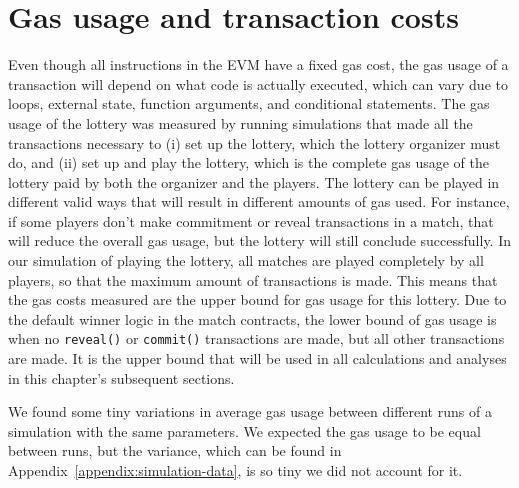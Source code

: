 \section{Gas usage and transaction costs}
\label{sec:gas}

Even though all instructions in the EVM have a fixed gas cost, the gas usage of a transaction will depend on what code is actually executed, which can vary due to loops, external state, function arguments, and conditional statements. The gas usage of the lottery was measured by running simulations that made all the transactions necessary to (i) set up the lottery, which the lottery organizer must do, and (ii) set up and play the lottery, which is the complete gas usage of the lottery paid by both the organizer and the players. The lottery can be played in different valid ways that will result in different amounts of gas used. For instance, if some players don't make commitment or reveal transactions in a match, that will reduce the overall gas usage, but the lottery will still conclude successfully. In our simulation of playing the lottery, all matches are played completely by all players, so that the maximum amount of transactions is made. This means that the gas costs measured are the upper bound for gas usage for this lottery. Due to the default winner logic in the match contracts, the lower bound of gas usage is when no \texttt{reveal()} or \texttt{commit()} transactions are made, but all other transactions are made. It is the upper bound that will be used in all calculations and analyses in this chapter's subsequent sections.

We found some tiny variations in average gas usage between different runs of a simulation with the same parameters. We expected the gas usage to be equal between runs, but the variance, which can be found in Appendix~\ref{appendix:simulation-data}, is so tiny we did not account for it.

